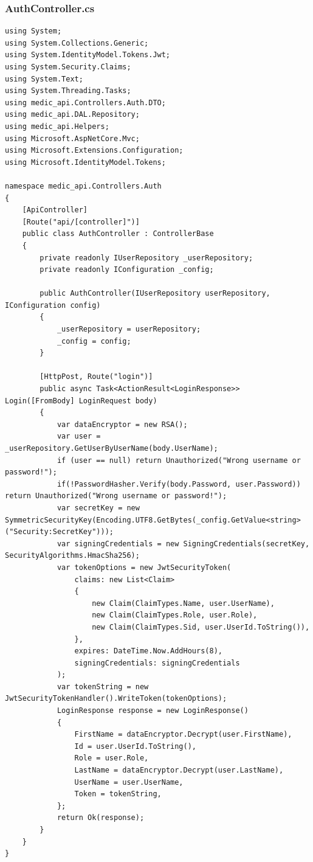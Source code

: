 \documentclass[12pt,a4paper]{article}
\begin{document}
	\subsubsection{AuthController.cs}
	\begin{lstlisting}
using System;
using System.Collections.Generic;
using System.IdentityModel.Tokens.Jwt;
using System.Security.Claims;
using System.Text;
using System.Threading.Tasks;
using medic_api.Controllers.Auth.DTO;
using medic_api.DAL.Repository;
using medic_api.Helpers;
using Microsoft.AspNetCore.Mvc;
using Microsoft.Extensions.Configuration;
using Microsoft.IdentityModel.Tokens;

namespace medic_api.Controllers.Auth
{
    [ApiController]
    [Route("api/[controller]")]
    public class AuthController : ControllerBase
    {
        private readonly IUserRepository _userRepository;
        private readonly IConfiguration _config;

        public AuthController(IUserRepository userRepository, IConfiguration config)
        {
            _userRepository = userRepository;
            _config = config;
        }

        [HttpPost, Route("login")]
        public async Task<ActionResult<LoginResponse>> Login([FromBody] LoginRequest body)
        {
            var dataEncryptor = new RSA();
            var user = _userRepository.GetUserByUserName(body.UserName);
            if (user == null) return Unauthorized("Wrong username or password!");
            if(!PasswordHasher.Verify(body.Password, user.Password)) return Unauthorized("Wrong username or password!");
            var secretKey = new SymmetricSecurityKey(Encoding.UTF8.GetBytes(_config.GetValue<string>("Security:SecretKey")));
            var signingCredentials = new SigningCredentials(secretKey, SecurityAlgorithms.HmacSha256);
            var tokenOptions = new JwtSecurityToken(
                claims: new List<Claim>
                {
                    new Claim(ClaimTypes.Name, user.UserName),
                    new Claim(ClaimTypes.Role, user.Role),
                    new Claim(ClaimTypes.Sid, user.UserId.ToString()),
                },
                expires: DateTime.Now.AddHours(8),
                signingCredentials: signingCredentials
            );
            var tokenString = new JwtSecurityTokenHandler().WriteToken(tokenOptions);
            LoginResponse response = new LoginResponse()
            {
                FirstName = dataEncryptor.Decrypt(user.FirstName),
                Id = user.UserId.ToString(),
                Role = user.Role,
                LastName = dataEncryptor.Decrypt(user.LastName),
                UserName = user.UserName,
                Token = tokenString,
            };
            return Ok(response);
        }
    }
}
	\end{lstlisting}
\end{document}
